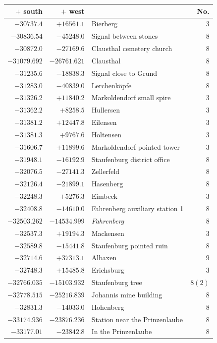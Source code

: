 \begin{center}\begingroup\fontsize{8}{9}\selectfont
\setlength{\tabcolsep}{4pt}
\begin{tabular}{r|r|p{170pt}|r}\hline
\(+\) south&\(+\) west&&No.\\\hline
\(-30737.4\)&\(+16561.1\)&Bierberg&\(3\)\\
\(-30836.54\)&\(-45248.0\)&Signal between stones&\(8\)\\
\(-30872.0\)&\(-27169.6\)&Clausthal cemetery church&\(8\)\\
\(-31079.692\)&\(-26761.621\)&Clausthal&\(8\)\\
\(-31235.6\)&\(-18838.3\)&Signal close to Grund&\(8\)\\
\(-31283.0\)&\(-40839.0\)&Lerchenköpfe&\(8\)\\
\(-31326.2\)&\(+11840.2\)&Markoldendorf small spire&\(3\)\\
\(-31362.2\)&\(+8258.5\)&Hullersen&\(3\)\\
\(-31381.2\)&\(+12447.8\)&Eilensen&\(3\)\\
\(-31381.3\)&\(+9767.6\)&Holtensen&\(3\)\\
\(-31606.7\)&\(+11899.6\)&Markoldendorf pointed tower&\(3\)\\
\(-31948.1\)&\(-16192.9\)&Staufenburg district office&\(8\)\\
\(-32076.5\)&\(-27141.3\)&Zellerfeld&\(8\)\\
\(-32126.4\)&\(-21899.1\)&Hasenberg&\(8\)\\
\(-32248.3\)&\(+5276.3\)&Eimbeck&\(3\)\\
\(-32408.8\)&\(-14610.0\)&Fahrenberg auxiliary station 1&\(8\)\\
\(-32503.262\)&\(-14534.999\)&\textit{Fahrenberg}&\(8\)\\
\(-32537.3\)&\(+19194.3\)&Mackensen&\(3\)\\
\(-32589.8\)&\(-15441.8\)&Staufenburg pointed ruin&\(8\)\\
\(-32714.6\)&\(+37313.1\)&Albaxen&\(9\)\\
\(-32748.3\)&\(+15485.8\)&Erichsburg&\(3\)\\
\(-32766.035\)&\(-15103.932\)&Staufenburg tree&\(8 (2)\)\\
\(-32778.515\)&\(-25216.839\)&Johannis mine building&\(8\)\\
\(-32831.3\)&\(-14033.0\)&Hohenberg&\(8\)\\
\(-33174.936\)&\(-23876.236\)&Station near the Prinzenlaube&\(8\)\\
\(-33177.01\)&\(-23842.8\)&In the Prinzenlaube&\(8\)\\

\end{tabular}
\end{center}
